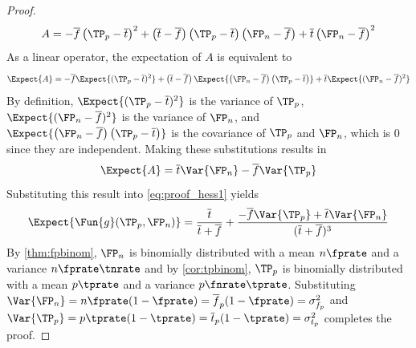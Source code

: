 \begin{proof}
\begin{equation}
    A = -\overline{f} \left(\TP_p - \overline{t}\right)^2 +
    \left(\overline{t}-\overline{f}\right)\left(\TP_p -
    \overline{t}\right)\left(\FP_n - \overline{f}\right) +
    \overline{t}\left(\FP_n - \overline{f}\right)^2
\end{equation}
As a linear operator, the expectation of $A$ is equivalent to
\begin{equation}
    \Expect{A} = -\overline{f} \Expect{(\TP_p - \overline{t})^2} + \left(\overline{t}-\overline{f}\right)\Expect{\left(\FP_n - \overline{f}\right)\left(\TP_p - \overline{t}\right)} + \overline{t}\Expect{(\FP_n - \overline{f})^2}
\end{equation}
By definition, $\Expect{(\TP_p - \overline{t})^2}$ is the variance of $\TP_p$, $\Expect{(\FP_n - \overline{f})^2}$ is the variance of $\FP_n$, and $\Expect{\left(\FP_n - \overline{f}\right)\left(\TP_p - \overline{t}\right)}$ is the covariance of $\TP_p$ and $\FP_n$, which is $0$ since they are independent.
Making these substitutions results in
\begin{equation}
    \Expect{A} = \overline{t} \Var{\FP_n} - \overline{f} \Var{\TP_p}
\end{equation}
Substituting this result into \cref{eq:proof_hess1} yields
\begin{equation}
    \Expect{\Fun{g}(\TP_p,\FP_n)} =
    \frac{\overline{t}}{\overline{t}+\overline{f}} +
    \frac{-\overline{f} \Var{\TP_p} +
    \overline{t}\Var{\FP_n}}{(\overline{t} + \overline{f})^3}
\end{equation}
By \cref{thm:fpbinom}, $\FP_n$ is binomially distributed with a mean $n \fprate$ and a variance $n \fprate \tnrate$ and by \cref{cor:tpbinom}, $\TP_p$ is binomially distributed with a mean $p \tprate$ and a variance $p \fnrate \tprate$.
Substituting $\Var{\FP_n} = n \fprate(1-\fprate) = \overline{f}_p(1-\fprate) = \sigma_{f_p}^2$ and $\Var{\TP_p} = p \tprate(1-\tprate) = \overline{t}_p(1-\tprate) = \sigma_{t_p}^2$ completes the proof.
\end{proof}

